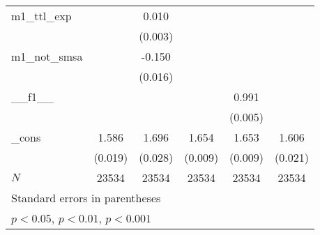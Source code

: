 \begin{tabular}{l*{5}{c}}
m1\_ttl\_exp  &                     &       0.010\sym{***}&                     &                     &                     \\
            &                     &     (0.003)         &                     &                     &                     \\
 
m1\_not\_smsa &                     &      -0.150\sym{***}&                     &                     &                     \\
            &                     &     (0.016)         &                     &                     &                     \\
 
\_\_f1\_\_      &                     &                     &                     &       0.991\sym{***}&                     \\
            &                     &                     &                     &     (0.005)         &                     \\
 
\_cons      &       1.586\sym{***}&       1.696\sym{***}&       1.654\sym{***}&       1.653\sym{***}&       1.606\sym{***}\\
            &     (0.019)         &     (0.028)         &     (0.009)         &     (0.009)         &     (0.021)         \\
\hline
\(N\)       &       23534         &       23534         &       23534         &       23534         &       23534         \\
\hline\hline
\multicolumn{6}{l}{\footnotesize Standard errors in parentheses}\\
\multicolumn{6}{l}{\footnotesize \sym{*} \(p<0.05\), \sym{**} \(p<0.01\), \sym{***} \(p<0.001\)}\\
\end{tabular}

